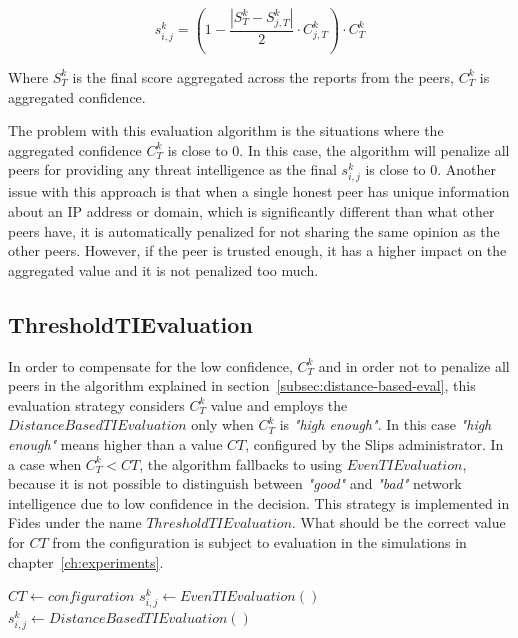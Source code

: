 \begin{equation}
s^{k}_{i, j} = \left(1 - \frac{|{S}^{k}_{T} - S^{k}_{j, T}|}{2} \cdot C^{k}_{j, T}\right) \cdot C^{k}_{T}
\end{equation}

Where $S^{k}_{T}$ is the final score aggregated across the reports from the peers, $C^{k}_{T}$ is aggregated confidence.

The problem with this evaluation algorithm is the situations where the aggregated confidence $C^{k}_{T}$ is close to $0$. In this case, the algorithm will penalize all peers for providing any threat intelligence as the final $s^{k}_{i, j}$ is close to $0$. Another issue with this approach is that when a single honest peer has unique information about an IP address or domain, which is significantly different than what other peers have, it is automatically penalized for not sharing the same opinion as  the other peers. However, if the peer is trusted enough, it has a higher impact on the aggregated value and it is not penalized too much.

\subsection{ThresholdTIEvaluation}
\label{subsec:network-intelligence-conf-high-enough}
In order to compensate for the low confidence, $C^{k}_{T}$ and in order not to penalize all peers in the algorithm explained in section~\ref{subsec:distance-based-eval}, this evaluation strategy considers $C^{k}_{T}$ value and employs the $DistanceBasedTIEvaluation$ only when $C^{k}_{T}$ is \textit{"high enough"}. In this case \textit{"high enough"} means higher than a value ${CT}$, configured by the Slips administrator.
In a case when  $C^{k}_{T} < {CT}$, the algorithm fallbacks to using $EvenTIEvaluation$, because it is not possible to distinguish between \textit{"good"} and \textit{"bad"} network intelligence due to low confidence in the decision. 
This strategy is implemented in Fides under the name $ThresholdTIEvaluation$.
What should be the correct value for $CT$ from the configuration is subject to evaluation in the simulations in chapter~\ref{ch:experiments}.

\begin{algorithm}
\caption{$ThresholdTIEvaluation$}\label{alg:threshold-ti-evaluation}
\begin{algorithmic}[1]
\State ${CT} \gets configuration$ 
	\State $s^{k}_{i, j} \gets EvenTIEvaluation()$
\Else
    \State $s^{k}_{i, j} \gets DistanceBasedTIEvaluation()$
\EndIf
\end{algorithmic}
\end{algorithm}

